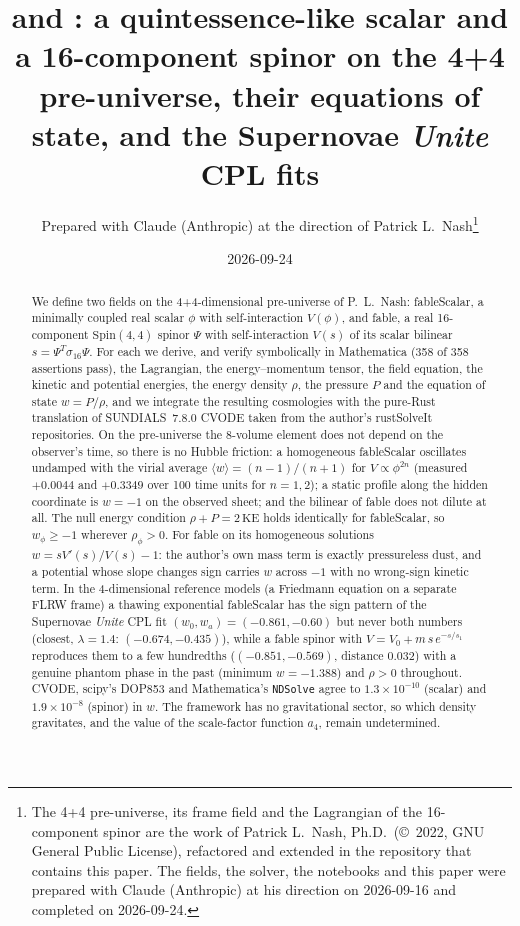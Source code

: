 \documentclass[11pt,a4paper]{article}
\title{\fableScalar{} and \fable{}: a quintessence-like scalar and a 16-component spinor on the
4+4 pre-universe, their equations of state, and the Supernovae \emph{Unite} CPL fits}
\author{Prepared with Claude (Anthropic) at the direction of Patrick L.~Nash\thanks{The 4+4
pre-universe, its frame field and the Lagrangian of the 16-component spinor are the work of
Patrick L.~Nash, Ph.D.\ (\copyright~2022, GNU General Public License), refactored and extended in
the repository that contains this paper. The fields, the solver, the notebooks and this paper
were prepared with Claude (Anthropic) at his direction on 2026-09-16 and completed on
2026-09-24.}}
\date{2026-09-24}
\newcommand{\fableScalar}{\textsf{fableScalar}}
\newcommand{\fable}{\textsf{fable}}
\newcommand{\sig}{\sigma_{16}}
\begin{document}
\maketitle

\begin{abstract}
We define two fields on the 4+4-dimensional pre-universe of P.~L.~Nash: \fableScalar{}, a
minimally coupled real scalar $\phi$ with self-interaction $V(\phi)$, and \fable{}, a real
16-component $\mathrm{Spin}(4,4)$ spinor $\Psi$ with self-interaction $V(s)$ of its scalar bilinear
$s=\Psi^{T}\sig\Psi$. For each we derive, and verify symbolically in Mathematica (358 of 358
assertions pass), the Lagrangian, the energy--momentum tensor, the field equation, the kinetic
and potential energies, the energy density $\rho$, the pressure $P$ and the equation of state
$w=P/\rho$, and we integrate the resulting cosmologies with the pure-Rust translation of
SUNDIALS~7.8.0 CVODE taken from the author's rustSolveIt repositories. On the pre-universe the
8-volume element does not depend on the observer's time, so there is no Hubble friction: a
homogeneous \fableScalar{} oscillates undamped with the virial average
$\langle w\rangle=(n-1)/(n+1)$ for $V\propto\phi^{2n}$ (measured $+0.0044$ and $+0.3349$ over 100
time units for $n=1,2$); a static profile along the hidden coordinate is $w=-1$ on the observed
sheet; and the bilinear of \fable{} does not dilute at all. The null energy condition
$\rho+P=2\,\mathrm{KE}$ holds identically for \fableScalar{}, so $w_\phi\ge-1$ wherever
$\rho_\phi>0$. For \fable{} on its homogeneous solutions $w=sV'(s)/V(s)-1$: the author's own mass
term is exactly pressureless dust, and a potential whose slope changes sign carries $w$ across
$-1$ with no wrong-sign kinetic term. In the 4-dimensional reference models (a Friedmann
equation on a separate FLRW frame) a thawing exponential \fableScalar{} has the sign pattern of the
Supernovae \emph{Unite} CPL fit $(w_0,w_a)=(-0.861,-0.60)$ but never both numbers (closest,
$\lambda=1.4$: $(-0.674,-0.435)$), while a \fable{} spinor with $V=V_0+m\,s\,e^{-s/s_1}$ reproduces
them to a few hundredths ($(-0.851,-0.569)$, distance $0.032$) with a genuine phantom phase in the
past (minimum $w=-1.388$) and $\rho>0$ throughout. CVODE, scipy's DOP853 and Mathematica's
\texttt{NDSolve} agree to $1.3\times10^{-10}$ (scalar) and $1.9\times10^{-8}$ (spinor) in $w$. The
framework has no gravitational sector, so which density gravitates, and the value of the
scale-factor function $a_4$, remain undetermined.
\end{abstract}
\end{document}
